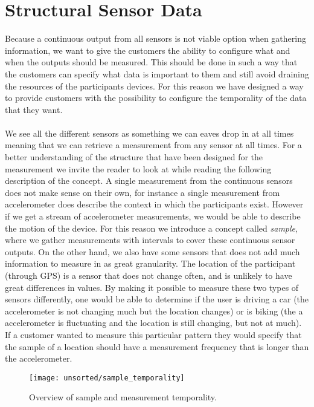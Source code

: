 \section{Structural Sensor Data}
\label{sec:structural_sensor_data}
Because a continuous output from all sensors is not viable option when gathering information, we want to give the customers the ability to configure what and when the outputs should be measured. This should be done in such a way that the customers can specify what data is important to them and still avoid draining the resources of the participants devices. For this reason we have designed a way to provide customers with the possibility to configure the temporality of the data that they want. 
\\\\
We see all the different sensors as something we can eaves drop in at all times meaning that we can retrieve a measurement from any sensor at all times. For a better understanding of the structure that have been designed for the measurement we invite the reader to look at  while reading the following description of the concept. A single measurement from the continuous sensors does not make sense on their own, for instance a single measurement from accelerometer does describe the context in which the participants exist. However if we get a stream of accelerometer measurements, we would be able to describe the motion of the device. For this reason we introduce a concept called \emph{sample}, where we gather measurements with intervals to cover these continuous sensor outputs. On the other hand, we also have some sensors that does not add much information to measure in as great granularity. The location of the participant (through GPS) is a sensor that does not change often, and is unlikely to have great differences in values. By making it possible to measure these two types of sensors differently, one would be able to determine if the user is driving a car (the accelerometer is not changing much but the location changes) or is biking (the a accelerometer is fluctuating and the location is still changing, but not at much). If a customer wanted to measure this particular pattern they would specify that the sample of a location should have a measurement frequency that is longer than the accelerometer.

\begin{figure}[!htbp]
    \centering
    \texttt{[image: unsorted/sample\_temporality]}
    \caption{Overview of sample and measurement temporality.}
    \label{fig:sample_temporality}
\end{figure}
\FloatBarrier

